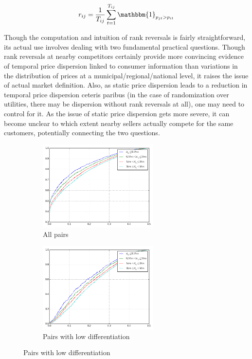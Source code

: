 \documentclass[11pt]{article}
\begin{document}
\begin{align*}
r_{ij} = \frac{1}{T_{ij}} \sum_{t=1}^{T_{ij}} \mathbbm{1}_{p_{jt} > p_{it}}
\end{align*}

Though the computation and intuition of rank reversals is fairly straightforward, its actual use involves dealing with two fundamental practical questions. Though rank reversals at nearby competitors certainly provide more convincing evidence of temporal price dispersion linked to consumer information than variations in the distribution of prices at a municipal/regional/national level, it raises the issue of actual market definition. Also, as static price dispersion leads to a reduction in temporal price dispersion ceteris paribus (in the case of randomization over utilities, there may be dispersion without rank reversals at all), one may need to control for it. As the issue of static price dispersion gets more severe, it can become unclear to which extent nearby sellers actually compete for the same customers, potentially connecting the two questions.

\begin{figure}[H]
\centering
\begin{subfigure}{.4\linewidth}
\centering
\includegraphics[width=6cm]{graphs/ecdf_rr_all.png}
\caption[short]{All pairs}
\end{subfigure}
\begin{subfigure}{.4\linewidth}
\centering
\includegraphics[width=6cm]{graphs/ecdf_rr_nodiff.png}
\caption[short]{Pairs with low differentiation}
\end{subfigure}
\end{figure}
\end{document}
